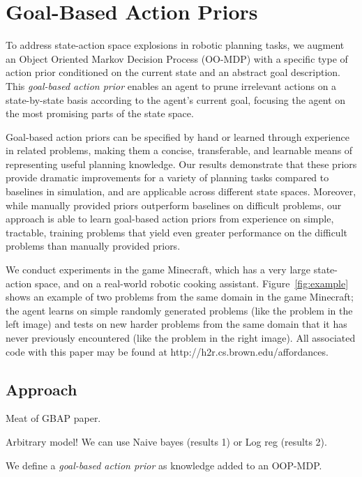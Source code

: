 \documentclass[11pt]{article}
\begin{document}
\section{Goal-Based Action Priors}
\label{sec:gbaps}

To address state-action space explosions in robotic planning tasks,
we augment an Object Oriented Markov Decision Process (OO-MDP) with a
specific type of action prior conditioned on the current state and an abstract goal description. This {\it goal-based action prior}
enables an agent to prune irrelevant actions on a
state-by-state basis according to the agent's current goal, focusing the agent on
the most promising parts of the state space.  
 
Goal-based action priors can be specified
by hand or learned through experience in related
problems, making them a concise, transferable, and learnable means of
representing useful planning knowledge. Our results demonstrate
that these priors provide dramatic improvements for a variety of
planning tasks compared to baselines in simulation, and are applicable
across different state spaces.  Moreover, while manually provided
priors outperform baselines on difficult problems, our approach
is able to learn goal-based action priors from experience on simple, tractable, 
training problems that yield even greater performance on the difficult problems
than manually provided priors.

We conduct experiments in
the game Minecraft, which has a very large state-action space, and on
a real-world robotic cooking assistant.  Figure~\ref{fig:example}
shows an example of two problems from the same domain in the game
Minecraft; the agent learns on simple randomly generated problems
(like the problem in the left image) and tests
on new harder problems from the same domain that it has never previously
encountered (like the problem in the right image). All associated code with this paper may be found at
http://h2r.cs.brown.edu/affordances.



\subsection{Approach}
Meat of GBAP paper.

Arbitrary model! We can use Naive bayes (results 1) or Log reg (results 2).

We define a {\it goal-based action prior} as knowledge added to an OOP-MDP.
\end{document}

